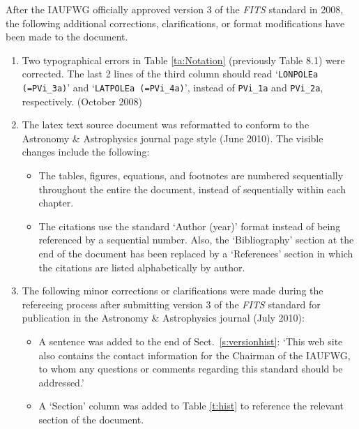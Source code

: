 \documentclass[onecolumn]{aa}
\begin{document}
After the IAUFWG officially approved version 3 of the {\em FITS\/} standard in 
2008, the following additional corrections, clarifications, or format modifications
have been made to the document.

\begin{enumerate} 

\item Two typographical errors in Table \ref{ta:Notation} (previously Table 8.1) 
were corrected.  The last 2 lines of the third column should read 
`{\tt LONPOLEa (=PVi\_3a)}' and `{\tt LATPOLEa (=PVi\_4a)}',
instead of {\tt PVi\_1a} and {\tt PVi\_2a}, respectively. (October 2008)

\item The latex text source document was reformatted to conform to the Astronomy \&
Astrophysics journal page style (June 2010).  The visible changes
include the following:

\begin{itemize} 

\item The tables, figures, equations, and footnotes are 
numbered sequentially  throughout the entire the document, instead of
sequentially within each chapter.

\item The citations use the standard `Author (year)' format instead 
of being referenced by a sequential number. Also, the
`Bibliography' section at the end of the document has been replaced by a
`References' section in which the citations are listed alphabetically by
author.

\end{itemize}

\item The following minor corrections or clarifications were made during the refereeing
process after submitting version 3 of the {\em FITS\/} standard  for publication in 
the Astronomy \& Astrophysics journal  (July 2010):

\begin{itemize} 

\item A sentence was added to the end of Sect.\  \ref{s:versionhist}:
`This web site also contains the contact information for the Chairman of the
IAUFWG, to whom  any questions or comments regarding this standard
should be addressed.'

\item A `Section' column was added to Table \ref{t:hist} to reference the relevant
section of the document.


\end{itemize}
\end{enumerate}
\end{document}
